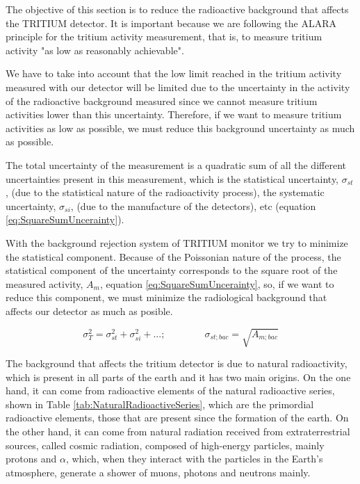 The objective of this section is to reduce the radioactive background that affects the TRITIUM detector. It is important because we are following the ALARA principle for the tritium activity measurement, that is, to measure tritium activity "as low as reasonably achievable".

We have to take into account that the low limit reached in the tritium activity measured with our detector will be limited due to the uncertainty in the activity of the radioactive background measured since we cannot measure tritium activities lower than this uncertainty. Therefore, if we want to measure tritium activities as low as possible, we must reduce this background uncertainty as much as possible.

The total uncertainty of the measurement is a quadratic sum of all the different uncertainties present in this measurement, which is the statistical uncertainty, $\sigma_{st}$, (due to the statistical nature of the radioactivity process), the systematic uncertainty, $\sigma_{si}$, (due to the manufacture of the detectors), etc (equation \ref{eq:SquareSumUncerainty}).

With the background rejection system of TRITIUM monitor we try to minimize the statistical component. Because of the Poissonian nature of the process, the statistical component of the uncertainty corresponds to the square root of the measured activity, $A_{m}$, equation \ref{eq:SquareSumUncerainty}, so, if we want to reduce this component, we must minimize the radiological background that affects our detector as much as posible.

\begin{equation}
\sigma_{T}^2 = \sigma_{st}^2 +\sigma_{si}^2 + ... ; \qquad \qquad \sigma_{st;bac} = \sqrt{A_{m;bac}}
\label{eq:SquareSumUncerainty}
\end{equation} 

The background that affects the tritium detector is due to natural radioactivity, which is present in all parts of the earth and it has two main origins. On the one hand, it can come from radioactive elements of the natural radioactive series, shown in Table \ref{tab:NaturalRadioactiveSeries}, which are the primordial radioactive elements, those that are present since the formation of the earth. On the other hand, it can come from natural radiation received from extraterrestrial sources, called cosmic radiation, composed of high-energy particles, mainly protons and $\alpha$, which, when they interact with the particles in the Earth's atmosphere, generate a shower of muons, photons and neutrons mainly.

